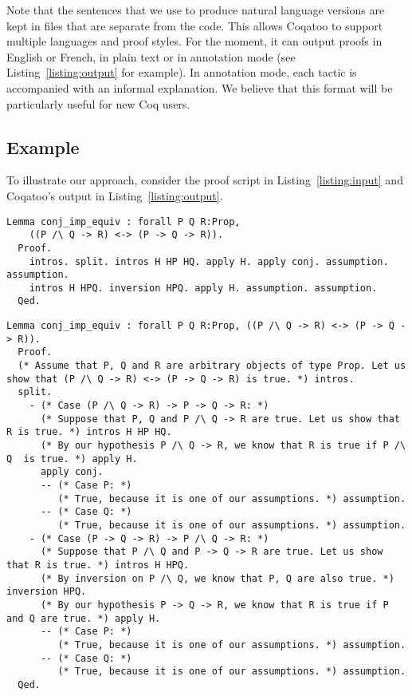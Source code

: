 \documentclass[sigplan,screen,9pt]{acmart}
\begin{document}
Note that the sentences that we use to produce natural language versions are kept in files that are separate from the code. This allows Coqatoo to support multiple languages and proof styles. For the moment, it can output proofs in English or French, in plain text or in annotation mode (see Listing~\ref{listing:output} for example). In annotation mode, each tactic is accompanied with an informal explanation. We believe that this format will be particularly useful for new Coq users.

\subsection{Example}
To illustrate our approach, consider the proof script in Listing~\ref{listing:input} and Coqatoo's output in Listing~\ref{listing:output}.
\begin{lstlisting}[label=listing:input,captionpos=b,caption=Proof script given as input]
  Lemma conj_imp_equiv : forall P Q R:Prop, 
    ((P /\ Q -> R) <-> (P -> Q -> R)).
  Proof.
    intros. split. intros H HP HQ. apply H. apply conj. assumption. assumption. 
    intros H HPQ. inversion HPQ. apply H. assumption. assumption.
  Qed.
\end{lstlisting}

\begin{figure*}
\begin{lstlisting}[label=listing:output, captionpos=b, caption={Output in annotation mode}]
  Lemma conj_imp_equiv : forall P Q R:Prop, ((P /\ Q -> R) <-> (P -> Q -> R)).
  Proof.
  (* Assume that P, Q and R are arbitrary objects of type Prop. Let us show that (P /\ Q -> R) <-> (P -> Q -> R) is true. *) intros.
  split.
    - (* Case (P /\ Q -> R) -> P -> Q -> R: *) 
      (* Suppose that P, Q and P /\ Q -> R are true. Let us show that R is true. *) intros H HP HQ.
      (* By our hypothesis P /\ Q -> R, we know that R is true if P /\ Q  is true. *) apply H.
      apply conj.
      -- (* Case P: *)
         (* True, because it is one of our assumptions. *) assumption.
      -- (* Case Q: *)
         (* True, because it is one of our assumptions. *) assumption.
    - (* Case (P -> Q -> R) -> P /\ Q -> R: *)
      (* Suppose that P /\ Q and P -> Q -> R are true. Let us show that R is true. *) intros H HPQ.
      (* By inversion on P /\ Q, we know that P, Q are also true. *) inversion HPQ.
      (* By our hypothesis P -> Q -> R, we know that R is true if P and Q are true. *) apply H.
      -- (* Case P: *)
         (* True, because it is one of our assumptions. *) assumption.
      -- (* Case Q: *)
         (* True, because it is one of our assumptions. *) assumption.
  Qed.
\end{lstlisting}
\end{figure*}
\end{document}
